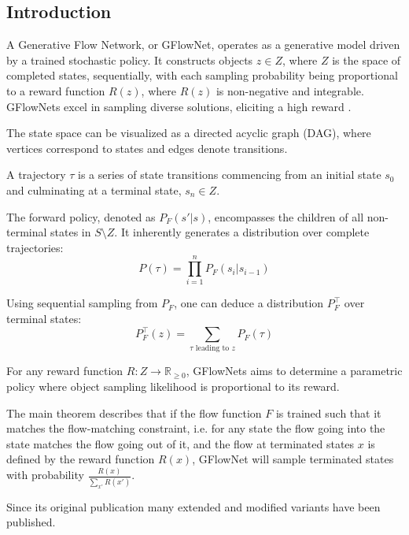 \subsection{Introduction}

A Generative Flow Network, or GFlowNet, operates as a generative model driven by a trained stochastic policy. It constructs objects $z \in Z$, where $Z$ is the space of completed states, sequentially, with each sampling probability being proportional to a reward function $R(z)$, where $R(z)$ is non-negative and integrable. GFlowNets excel in sampling diverse solutions, eliciting a high reward \cite{bengio_flow_2021}.

The state space can be visualized as a directed acyclic graph (DAG), where vertices correspond to states and edges denote transitions.

A trajectory $\tau$ is a series of state transitions commencing from an initial state $s_0$ and culminating at a terminal state, $s_n \in Z$.

The forward policy, denoted as $P_F(s'|s)$, encompasses the children of all non-terminal states in $S \setminus Z$. It inherently generates a distribution over complete trajectories:
\[ P(\tau) = \prod_{i=1}^{n} P_F(s_i|s_{i-1}) \]


Using sequential sampling from $P_F$, one can deduce a distribution $P^{\top}_F$ over terminal states:
\[ P^{\top}_F(z) = \sum_{\tau \text{ leading to } z} P_F(\tau) \]

For any reward function $R: Z \rightarrow \mathbb{R}_{\geq 0}$, GFlowNets aims to determine a parametric policy where object sampling likelihood is proportional to its reward.

The main theorem describes that if the flow function $F$ is trained such that it matches the flow-matching constraint, i.e. for any state the flow going into the state matches the flow going out of it, and the flow at terminated states $x$ is defined by the reward function $R(x)$, GFlowNet will sample terminated states with probability $\frac{R(x)}{\sum_{x\prime} R(x\prime)}$.


Since its original publication many extended and modified variants have been published.



